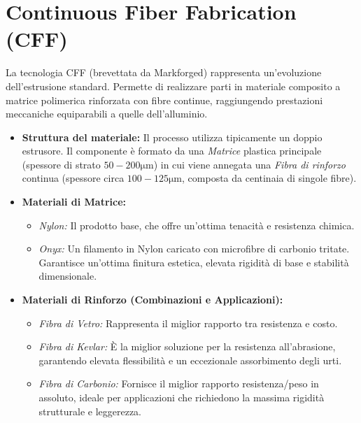 \section{Continuous Fiber Fabrication (CFF)}
La tecnologia CFF (brevettata da Markforged) rappresenta un'evoluzione dell'estrusione standard. Permette di realizzare parti in materiale composito a matrice polimerica rinforzata con fibre continue, raggiungendo prestazioni meccaniche equiparabili a quelle dell'alluminio.
\begin{itemize}
    \item \textbf{Struttura del materiale:} Il processo utilizza tipicamente un doppio estrusore. Il componente è formato da una \textit{Matrice} plastica principale (spessore di strato $ 50-200 \si{\micro\metre} $) in cui viene annegata una \textit{Fibra di rinforzo} continua (spessore circa $ 100-125 \si{\micro\metre} $, composta da centinaia di singole fibre).
    \item \textbf{Materiali di Matrice:}
          \begin{itemize}
              \item \textit{Nylon:} Il prodotto base, che offre un'ottima tenacità e resistenza chimica.
              \item \textit{Onyx:} Un filamento in Nylon caricato con microfibre di carbonio tritate. Garantisce un'ottima finitura estetica, elevata rigidità di base e stabilità dimensionale.
          \end{itemize}
    \item \textbf{Materiali di Rinforzo (Combinazioni e Applicazioni):}
          \begin{itemize}
              \item \textit{Fibra di Vetro:} Rappresenta il miglior rapporto tra resistenza e costo.
              \item \textit{Fibra di Kevlar:} È la miglior soluzione per la resistenza all'abrasione, garantendo elevata flessibilità e un eccezionale assorbimento degli urti.
              \item \textit{Fibra di Carbonio:} Fornisce il miglior rapporto resistenza/peso in assoluto, ideale per applicazioni che richiedono la massima rigidità strutturale e leggerezza.
          \end{itemize}
\end{itemize}


